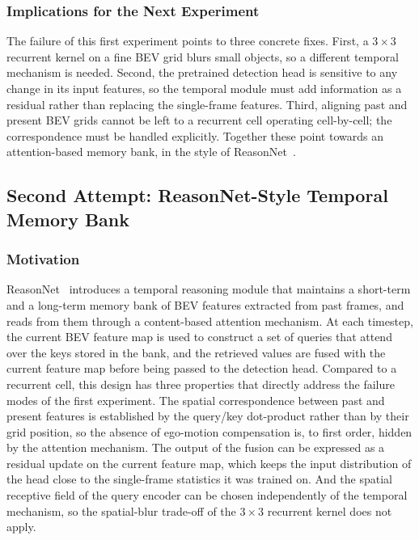 \documentclass[12pt,a4paper]{report}
\begin{document}
\subsubsection{Implications for the Next Experiment}
\quad The failure of this first experiment points to three concrete
fixes. First, a $3 \times 3$ recurrent kernel on a fine BEV grid
blurs small objects, so a different temporal mechanism is needed.
Second, the pretrained detection head is sensitive to any change
in its input features, so the temporal module must add information
as a residual rather than replacing the single-frame features.
Third, aligning past and present BEV grids cannot be left to a
recurrent cell operating cell-by-cell; the correspondence must be
handled explicitly. Together these point towards an
attention-based memory bank, in the style of
ReasonNet~\cite{Shao2023ReasonNet}.

\subsection{Second Attempt: ReasonNet-Style Temporal Memory Bank}

\subsubsection{Motivation}
\quad ReasonNet~\cite{Shao2023ReasonNet} introduces a temporal
reasoning module that maintains a short-term and a long-term memory
bank of BEV features extracted from past frames, and reads from
them through a content-based attention mechanism. At each
timestep, the current BEV feature map is used to construct a set
of queries that attend over the keys stored in the bank, and the
retrieved values are fused with the current feature map before
being passed to the detection head. Compared to a recurrent cell,
this design has three properties that directly address the failure
modes of the first experiment. The spatial correspondence between
past and present features is established by the query/key
dot-product rather than by their grid position, so the absence of
ego-motion compensation is, to first order, hidden by the
attention mechanism. The output of the fusion can be expressed as
a residual update on the current feature map, which keeps the
input distribution of the head close to the single-frame
statistics it was trained on. And the spatial receptive field of
the query encoder can be chosen independently of the temporal
mechanism, so the spatial-blur trade-off of the $3 \times 3$
recurrent kernel does not apply.
\end{document}
